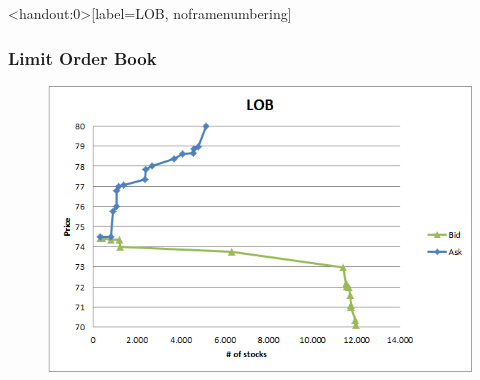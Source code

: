 \documentclass[english,10pt]{beamer}
\theoremstyle{definition}
\begin{document}
\begin{frame}<handout:0>[label=LOB, noframenumbering]
	\frametitle{Limit Order Book}
	\begin{figure}
	\includegraphics[width=.7\paperwidth]{pics/Graph_LOB}
	\end{figure}
	\hyperlink{main3}{}
\end{frame}
\end{document}
